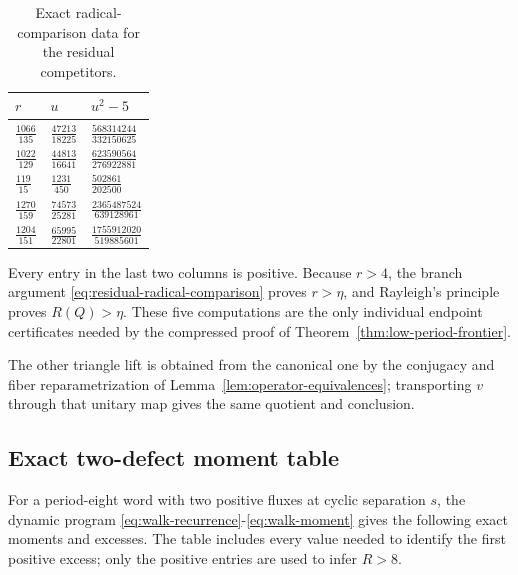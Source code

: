 \begin{table}[H]
\centering
\caption{Exact radical-comparison data for the residual competitors.}
\label{tab:residual-radical-data}
\begingroup
\renewcommand{\arraystretch}{1.35}
\begin{tabular}{lll}
\toprule
\(r\) & \(u\) & \(u^{2}-5\) \\
\midrule
\(\frac{1066}{135}\) & \(\frac{47213}{18225}\) & \(\frac{568314244}{332150625}\) \\
\(\frac{1022}{129}\) & \(\frac{44813}{16641}\) & \(\frac{623590564}{276922881}\) \\
\(\frac{119}{15}\) & \(\frac{1231}{450}\) & \(\frac{502861}{202500}\) \\
\(\frac{1270}{159}\) & \(\frac{74573}{25281}\) & \(\frac{2365487524}{639128961}\) \\
\(\frac{1204}{151}\) & \(\frac{65995}{22801}\) & \(\frac{1755912020}{519885601}\) \\
\bottomrule
\end{tabular}
\endgroup
\end{table}

Every entry in the last two columns is positive. Because \(r>4\), the branch
argument \eqref{eq:residual-radical-comparison} proves \(r>\eta\), and Rayleigh's principle proves \(R(Q)>\eta\).
These five computations are the only individual endpoint certificates needed
by the compressed proof of Theorem~\ref{thm:low-period-frontier}.

The other triangle lift is obtained from the canonical one by the conjugacy
and fiber reparametrization of Lemma~\ref{lem:operator-equivalences}; transporting \(v\) through that unitary
map gives the same quotient and conclusion.

\subsection{Exact two-defect moment table}

For a period-eight word with two positive fluxes at cyclic separation \(s\),
the dynamic program \eqref{eq:walk-recurrence}-\eqref{eq:walk-moment} gives the following exact moments and excesses.
The table includes every value needed to identify the first positive excess;
only the positive entries are used to infer \(R>8\).

